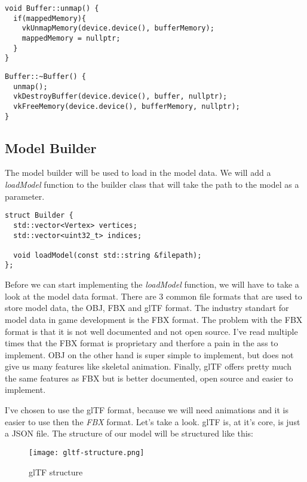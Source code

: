\documentclass[12pt]{report} \usepackage{preamble}
\begin{document}
\begin{lstlisting}[Language=C++]
void Buffer::unmap() {
  if(mappedMemory){
    vkUnmapMemory(device.device(), bufferMemory);
    mappedMemory = nullptr;
  }
}
\end{lstlisting}

\begin{lstlisting}[Language=C++]
Buffer::~Buffer() {
  unmap();
  vkDestroyBuffer(device.device(), buffer, nullptr);
  vkFreeMemory(device.device(), bufferMemory, nullptr);
}
\end{lstlisting}

\subsection{Model Builder}

The model builder will be used to load in the model data. We will add a \textit{loadModel} function to the builder class that will take the path to the model as a parameter.

\begin{lstlisting}[Language=C++]
struct Builder {
  std::vector<Vertex> vertices;
  std::vector<uint32_t> indices;

  void loadModel(const std::string &filepath);
};
\end{lstlisting}

Before we can start implementing the \textit{loadModel} function, we will have to take a look at the model data format.
There are 3 common file formats that are used to store model data, the \ac{OBJ}, \ac{FBX} and \ac{glTF} format.
The industry standart for model data in game development is the \ac{FBX} format. The problem with the \ac{FBX} format is that
it is not well documented and not open source. I've read multiple times that the \ac{FBX} format is  proprietary and therfore a
pain in the ass to implement. \ac{OBJ} on the other hand is super simple to implement, but does not give us many features
like skeletal animation. Finally, \ac{glTF} offers pretty much the same features as \ac{FBX} but is better documented,
open source and easier to implement.

I've chosen to use the \ac{glTF} format, because we will need animations and it is easier to use then the \textit{FBX}
format. Let's take a look. \ac{glTF} is, at it's core, is just a JSON file. The structure of our model will be
structured like this:

\begin{figure}[hbtp]
	\centering \texttt{[image: gltf-structure.png]}
	\caption{glTF structure}
\end{figure} \FloatBarrier
\end{document}
